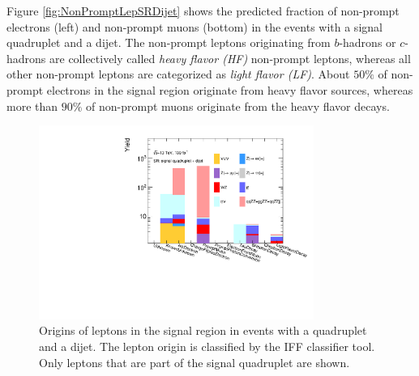 Figure \ref{fig:NonPromptLepSRDijet} shows the predicted fraction of non-prompt electrons (left) and non-prompt muons (bottom) in the events with a signal quadruplet and a dijet. The non-prompt leptons originating from $b$-hadrons or $c$-hadrons are collectively called \textit{heavy flavor (HF)} non-prompt leptons, whereas all other non-prompt leptons are categorized as \textit{light flavor (LF)}. About $50\%$ of non-prompt electrons in the signal region originate from heavy flavor sources, whereas more than $90\%$ of non-prompt muons originate from the heavy flavor decays.

\begin{figure}[htb]
    \centering
    \includegraphics[width = 0.8\textwidth]{figures/Analysis/Background/AllLeptonSRDijetComposition.pdf}
    \caption{ Origins of leptons in the signal region in events with a quadruplet and a dijet. The lepton origin is classified by the IFF classifier tool. Only leptons that are part of the signal quadruplet are shown.\label{fig:LeptonCompositionSRVBS}}
\end{figure}

